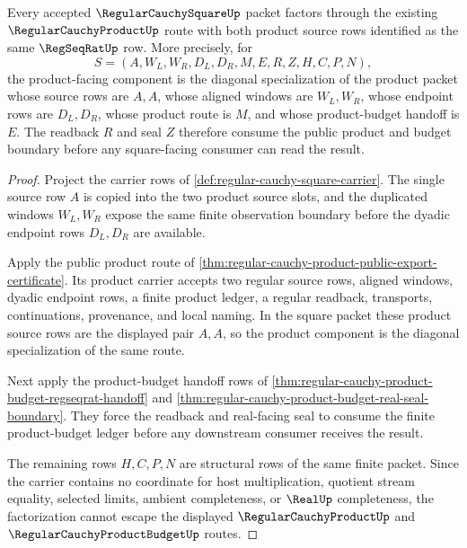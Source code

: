 \begin{theorem}
\label{thm:regular-cauchy-square-product-handoff}
Every accepted $\RegularCauchySquareUp$ packet factors through the existing $\RegularCauchyProductUp$ route with both product source rows identified as the same $\RegSeqRatUp$ row. More precisely, for
$$
S=(A,W_L,W_R,D_L,D_R,M,E,R,Z,H,C,P,N),
$$
the product-facing component is the diagonal specialization of the product packet whose source rows are $A,A$, whose aligned windows are $W_L,W_R$, whose endpoint rows are $D_L,D_R$, whose product route is $M$, and whose product-budget handoff is $E$. The readback $R$ and seal $Z$ therefore consume the public product and budget boundary before any square-facing consumer can read the result.
\end{theorem}
\begin{proof}
Project the carrier rows of \autoref{def:regular-cauchy-square-carrier}. The single source row $A$ is copied into the two product source slots, and the duplicated windows $W_L,W_R$ expose the same finite observation boundary before the dyadic endpoint rows $D_L,D_R$ are available.

Apply the public product route of \autoref{thm:regular-cauchy-product-public-export-certificate}. Its product carrier accepts two regular source rows, aligned windows, dyadic endpoint rows, a finite product ledger, a regular readback, transports, continuations, provenance, and local naming. In the square packet these product source rows are the displayed pair $A,A$, so the product component is the diagonal specialization of the same route.

Next apply the product-budget handoff rows of \autoref{thm:regular-cauchy-product-budget-regseqrat-handoff} and \autoref{thm:regular-cauchy-product-budget-real-seal-boundary}. They force the readback and real-facing seal to consume the finite product-budget ledger before any downstream consumer receives the result.

The remaining rows $H,C,P,N$ are structural rows of the same finite packet. Since the carrier contains no coordinate for host multiplication, quotient stream equality, selected limits, ambient completeness, or $\RealUp$ completeness, the factorization cannot escape the displayed $\RegularCauchyProductUp$ and $\RegularCauchyProductBudgetUp$ routes.
\end{proof}



